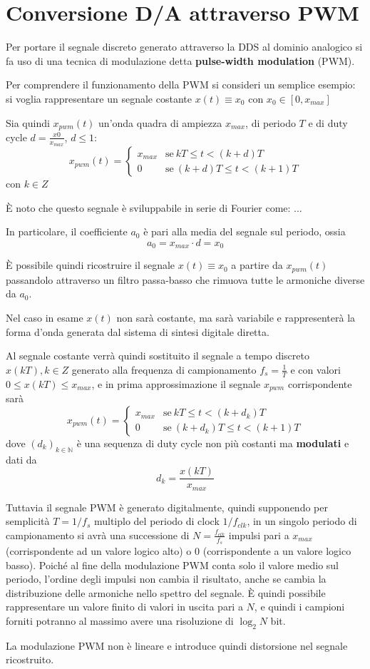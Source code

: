 \section{Conversione D/A attraverso PWM}
Per portare il segnale discreto generato attraverso la DDS al dominio analogico si fa uso di una tecnica di modulazione detta \textbf{pulse-width modulation} (PWM).

Per comprendere il funzionamento della PWM si consideri un semplice esempio: si voglia rappresentare un segnale costante $x(t) \equiv x_0$ con $x_0 \in [0, x_{max}]$

Sia quindi $x_{pwm}(t)$ un'onda quadra di ampiezza $x_{max}$, di periodo $T$ e di duty cycle $d=\frac{x0}{x_{max}}$, $d \le 1$:
\[
x_{pwm}(t) = \begin{cases}
	x_{max} & \text{se}\ kT \le t < (k+d)T \\
	0 & \text{se}\ (k+d)T \le t < (k+1)T
\end{cases}
\] 
con $k \in Z$

È noto che questo segnale è sviluppabile in serie di Fourier come: ...

In particolare, il coefficiente $a_0$ è pari alla media del segnale sul periodo, ossia
\[
a_0 = x_{max} \cdot d = x_0
\]

È possibile quindi ricostruire il segnale $x(t)\equiv x_0$ a partire da $x_{pwm}(t)$ passandolo attraverso un filtro passa-basso che rimuova tutte le armoniche diverse da $a_0$.

Nel caso in esame $x(t)$ non sarà costante, ma sarà variabile e rappresenterà la forma d'onda generata dal sistema di sintesi digitale diretta.

Al segnale costante verrà quindi sostituito il segnale a tempo discreto $x(kT), k \in Z$ generato alla frequenza di campionamento $f_s = \frac{1}{T}$ e con valori $0 \leq x(kT) \leq x_{max}$, e in prima approssimazione il segnale $x_{pwm}$ corrispondente sarà
\[
x_{pwm}(t) = \begin{cases}
	x_{max} & \text{se}\ kT \le t < (k + d_k)T \\
	0 & \text{se}\ (k+d_k)T \le t < (k+1)T
\end{cases}
\]
dove $(d_k)_{k \in \mathbb{N}}$ è una sequenza di duty cycle non più costanti ma \textbf{modulati} e dati da
\[
d_k = \frac{x(kT)}{x_{max}}
\]

Tuttavia il segnale PWM è generato digitalmente, quindi supponendo per semplicità $T=1/f_s$ multiplo del periodo di clock $1/f_{clk}$, in un singolo periodo
di campionamento si avrà una successione di $N=\frac{f_{clk}}{f_s}$ impulsi pari a $x_{max}$ (corrispondente ad un valore logico alto) o $0$ (corrispondente a un valore logico basso).
Poiché al fine della modulazione PWM conta solo il valore medio sul periodo, l'ordine degli impulsi non cambia il risultato, anche se cambia la distribuzione delle armoniche nello spettro del segnale.
È quindi possibile rappresentare un valore finito di valori in uscita pari a $N$, e quindi i campioni forniti potranno al massimo avere una risoluzione di $\log_2{N}$ bit.

La modulazione PWM non è lineare e introduce quindi distorsione nel segnale ricostruito.
